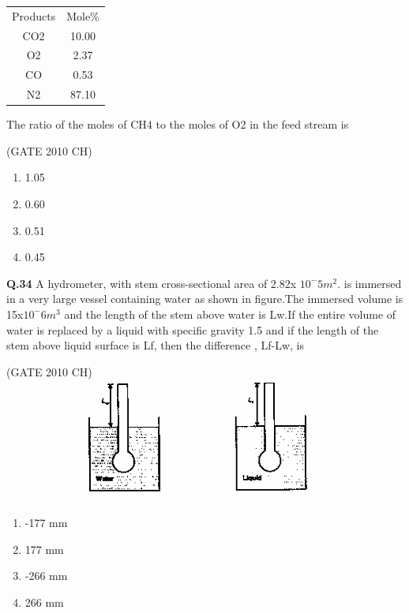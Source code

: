 \documentclass[journal,12pt,onecolumn]{exam}
\theoremstyle{remark}
\begin{document}
      \begin{tabular}{c|c}
      Products & Mole\%\\
        CO2   & 10.00 \\
        O2    & 2.37 \\
        CO    & 0.53 \\
        N2    & 87.10 \\
        
      \end{tabular}
    The ratio of the moles of CH4 to the moles of O2 in the feed stream is 
  
  \hfill{(GATE 2010 CH)}\\

  \begin{enumerate}
      \item 1.05
      \item 0.60
      \item 0.51
      \item 0.45
  \end{enumerate}

  \noindent
  \textbf{Q.34}
   A hydrometer, with stem cross-sectional area of 2.82x $10^-5 m^2$. is immersed in a very large vessel containing water as shown in figure.The immersed volume is 15x$10^-6 m^3$ and the length of the stem above water is Lw.If the entire volume of water is replaced by a liquid with specific gravity 1.5 and if the length of the stem above liquid surface is Lf, then the difference , Lf-Lw, is
   
   \hfill{(GATE 2010 CH)}\\
   
\includegraphics[width=1.0\linewidth]{images/Q.34 image.png}
     
    \begin{enumerate}
        \item -177 mm
        \item 177 mm
        \item -266 mm
        \item 266 mm
        
    \end{enumerate}
\end{document}
